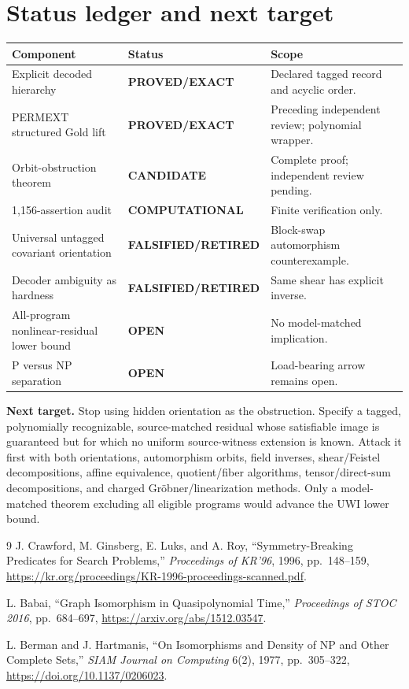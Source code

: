 \documentclass[11pt]{article}
\newcommand{\EXACT}{\textbf{PROVED/EXACT}}
\newcommand{\COMP}{\textbf{COMPUTATIONAL}}
\newcommand{\CAND}{\textbf{CANDIDATE}}
\newcommand{\OPEN}{\textbf{OPEN}}
\newcommand{\RET}{\textbf{FALSIFIED/RETIRED}}
\begin{document}
\section{Status ledger and next target}
\begin{center}\small
\begin{tabularx}{\textwidth}{@{}l l X@{}}
\toprule
Component & Status & Scope\\
\midrule
Explicit decoded hierarchy & \EXACT & Declared tagged record and acyclic order.\\
PERMEXT structured Gold lift & \EXACT & Preceding independent review; polynomial wrapper.\\
Orbit-obstruction theorem & \CAND & Complete proof; independent review pending.\\
1,156-assertion audit & \COMP & Finite verification only.\\
Universal untagged covariant orientation & \RET & Block-swap automorphism counterexample.\\
Decoder ambiguity as hardness & \RET & Same shear has explicit inverse.\\
All-program nonlinear-residual lower bound & \OPEN & No model-matched implication.\\
P versus NP separation & \OPEN & Load-bearing arrow remains open.\\
\bottomrule
\end{tabularx}
\end{center}

\textbf{Next target.}  Stop using hidden orientation as the obstruction.
Specify a tagged, polynomially recognizable, source-matched residual whose
satisfiable image is guaranteed but for which no uniform source-witness
extension is known.  Attack it first with both orientations, automorphism
orbits, field inverses, shear/Feistel decompositions, affine equivalence,
quotient/fiber algorithms, tensor/direct-sum decompositions, and charged
Gr\"obner/linearization methods.  Only a model-matched theorem excluding all
eligible programs would advance the UWI lower bound.

\begin{thebibliography}{9}
J. Crawford, M. Ginsberg, E. Luks, and A. Roy,
``Symmetry-Breaking Predicates for Search Problems,''
\emph{Proceedings of KR'96}, 1996, pp.~148--159,
\url{https://kr.org/proceedings/KR-1996-proceedings-scanned.pdf}.

L. Babai, ``Graph Isomorphism in Quasipolynomial Time,''
\emph{Proceedings of STOC 2016}, pp.~684--697,
\url{https://arxiv.org/abs/1512.03547}.

L. Berman and J. Hartmanis,
``On Isomorphisms and Density of NP and Other Complete Sets,''
\emph{SIAM Journal on Computing} 6(2), 1977, pp.~305--322,
\url{https://doi.org/10.1137/0206023}.
\end{thebibliography}
\end{document}
